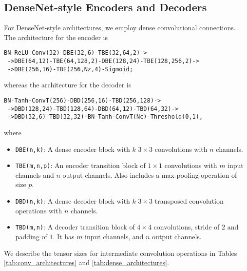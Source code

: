 \documentclass[runningheads]{llncs}
\begin{document}
\subsection{DenseNet-style Encoders and Decoders}
\label{sec:densenet}
For DenseNet-style architectures, we employ dense convolutional connections. The architecture for the 
encoder is 
\begin{verbatim}
BN-ReLU-Conv(32)-DBE(32,6)-TBE(32,64,2)->
 ->DBE(64,12)-TBE(64,128,2)-DBE(128,24)-TBE(128,256,2)->
 ->DBE(256,16)-TBE(256,Nz,4)-Sigmoid;
\end{verbatim}
whereas the architecture for the decoder is
\begin{verbatim}
BN-Tanh-ConvT(256)-DBD(256,16)-TBD(256,128)->
 ->DBD(128,24)-TBD(128,64)-DBD(64,12)-TBD(64,32)->
 ->DBD(32,6)-TBD(32,32)-BN-Tanh-ConvT(Nc)-Threshold(0,1),
\end{verbatim}
where
\begin{itemize}
    \item \texttt{DBE(n,k)}: A dense encoder block with $k$ $3\times 3$ convolutions with $n$ channels. 
    \item \texttt{TBE(m,n,p)}: An encoder transition block of $1 \times 1$ convolutions with $m$ input channels and $n$ output channels. Also includes a max-pooling operation of size $p$.
    \item \texttt{DBD(n,k)}: A dense decoder block with $k$ $3 \times 3$ transposed convolution operations with $n$ channels. 
    \item \texttt{TBD(m,n)}: A decoder transition block of $4 \times 4$ convolutions, stride of $2$ and padding of $1$. It has $m$ input channels, and $n$ output channels.
\end{itemize}

We describe the tensor sizes for intermediate convolution operations in Tables \ref{tab:conv_architectures} and \ref{tab:dense_architectures}.
\end{document}
